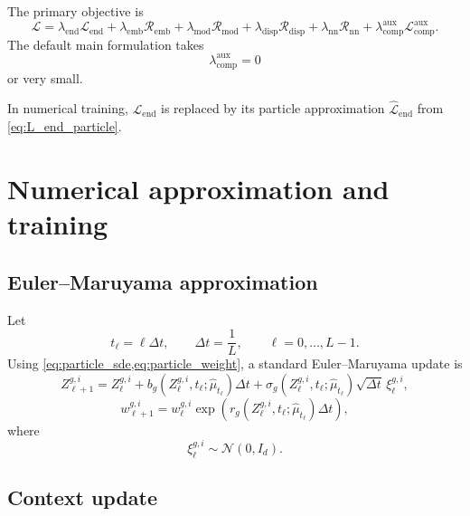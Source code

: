 \documentclass[11pt]{article}
\begin{document}
The primary objective is
\begin{equation}
\mathcal{L}
=
\lambda_{\mathrm{end}}\mathcal{L}_{\mathrm{end}}
+
\lambda_{\mathrm{emb}}\mathcal{R}_{\mathrm{emb}}
+
\lambda_{\mathrm{mod}}\mathcal{R}_{\mathrm{mod}}
+
\lambda_{\mathrm{disp}}\mathcal{R}_{\mathrm{disp}}
+
\lambda_{\mathrm{nn}}\mathcal{R}_{\mathrm{nn}}
+
\lambda_{\mathrm{comp}}^{\mathrm{aux}}\mathcal{L}_{\mathrm{comp}}^{\mathrm{aux}}.
\label{eq:full_objective}
\end{equation}
The default main formulation takes
\[
\lambda_{\mathrm{comp}}^{\mathrm{aux}}=0
\]
or very small.

In numerical training, $\mathcal{L}_{\mathrm{end}}$ is replaced by its particle approximation $\widehat{\mathcal{L}}_{\mathrm{end}}$ from \cref{eq:L_end_particle}.

\section{Numerical approximation and training}

\subsection{Euler--Maruyama approximation}

Let
\[
t_\ell=\ell\Delta t,
\qquad
\Delta t=\frac{1}{L},
\qquad
\ell=0,\dots,L-1.
\]
Using \cref{eq:particle_sde,eq:particle_weight}, a standard Euler--Maruyama update is
\begin{equation}
Z_{\ell+1}^{g,i}
=
Z_{\ell}^{g,i}
+
b_g\!\left(Z_\ell^{g,i},t_\ell;\hat\mu_{t_\ell}\right)\Delta t
+
\sigma_g\!\left(Z_\ell^{g,i},t_\ell;\hat\mu_{t_\ell}\right)\sqrt{\Delta t}\,\xi_\ell^{g,i},
\label{eq:em_state}
\end{equation}
\begin{equation}
w_{\ell+1}^{g,i}
=
w_{\ell}^{g,i}
\exp\!\left(
r_g\!\left(Z_\ell^{g,i},t_\ell;\hat\mu_{t_\ell}\right)\Delta t
\right),
\label{eq:em_weight}
\end{equation}
where
\[
\xi_\ell^{g,i}\sim\mathcal{N}(0,I_d).
\]

\subsection{Context update}
\end{document}
